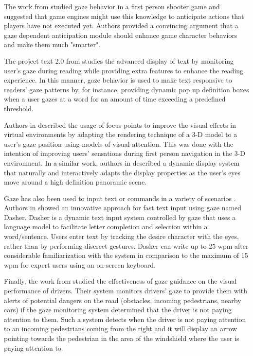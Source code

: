 \documentclass[]{article}
\begin{document}
The work from \cite{Koesling2011} studied gaze behavior in a first person shooter game and suggested that game engines
might use this knowledge to anticipate actions that players have not executed yet. Authors provided a convincing
argument that a gaze dependent anticipation module should enhance game character behaviors and make them much "smarter".


The project text 2.0 from \cite{Biedert2010} studies the advanced display of text by monitoring user's gaze during
reading while providing extra features to enhance the reading experience. In this manner, gaze behavior is used to
make text responsive to readers' gaze patterns by, for instance, providing dynamic pop up definition boxes when a user gazes at
a word for an amount of time exceeding a predefined threshold. 


Authors in \cite{Hillaire2008} described the usage of focus points to improve the visual effects in virtual environments
by adapting the rendering technique of a 3-D model to a user's gaze position using models of visual attention. This was
done with the intention of improving users' sensations during first person navigation in the 3-D environment.
In a similar work, authors in \cite{Rahardja2009} described a dynamic display system that naturally and interactively
adapts the display properties as the user's eyes move around a high definition panoramic scene.


Gaze has also been used to input text or commands in a variety of scenarios \cite{myiwann2011}. Authors in
\cite{fasthandsfreewritingbygaze} showed an innovative approach for fast text input using gaze named Dasher. Dasher is a
dynamic text input system controlled by gaze that uses a language model to facilitate letter completion and selection
within a word/sentence. Users enter text by tracking the desire character with the eyes, rather than by performing
discreet gestures. Dasher can write up to 25 wpm after considerable familiarization with the system in comparison to the
maximum of 15 wpm for expert users using an on-screen keyboard.
 

Finally, the work from \cite{Pomarjanschi2012} studied the effectiveness of gaze guidance on the visual performance of drivers.
Their system monitors drivers' gaze to provide them with alerts of potential dangers on the road (obstacles, incoming pedestrians,
nearby cars) if the gaze monitoring system determined that the driver is not paying attention to them. Such a
system detects when the driver is not paying attention to an incoming pedestrians coming from the right and it will
display an arrow pointing towards the pedestrian in the area of the windshield where the user is paying attention to.
\end{document}
